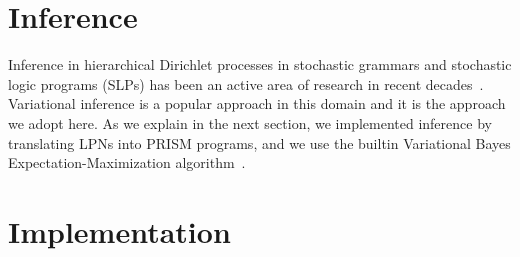 \documentclass[11pt, twocolumn]{article}
\begin{document}




\section{Inference}
Inference in hierarchical Dirichlet processes in stochastic grammars
and stochastic logic programs (SLPs) has been an active area of research in
recent
decades~\cite{DBLP:conf/emnlp/LiangPJK07,goldwater2006contextual,johnson2006adaptor,cussens2001parameter}.
Variational inference is a popular approach in this domain and it is
the approach we adopt here. As we explain in the next section, we
implemented inference by translating LPNs into PRISM programs, and we
use the builtin Variational Bayes Expectation-Maximization
algorithm~\cite{sato2008variational}.

\section{Implementation}
\end{document}
